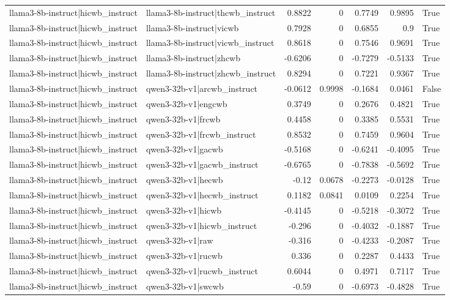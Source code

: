 \begin{table}
\begin{tabular}{l l r r r r l}
llama3-8b-instruct|hicwb_instruct & llama3-8b-instruct|thcwb_instruct & 0.8822 & 0 & 0.7749 & 0.9895 & True \\
llama3-8b-instruct|hicwb_instruct & llama3-8b-instruct|vicwb & 0.7928 & 0 & 0.6855 & 0.9 & True \\
llama3-8b-instruct|hicwb_instruct & llama3-8b-instruct|vicwb_instruct & 0.8618 & 0 & 0.7546 & 0.9691 & True \\
llama3-8b-instruct|hicwb_instruct & llama3-8b-instruct|zhcwb & -0.6206 & 0 & -0.7279 & -0.5133 & True \\
llama3-8b-instruct|hicwb_instruct & llama3-8b-instruct|zhcwb_instruct & 0.8294 & 0 & 0.7221 & 0.9367 & True \\
llama3-8b-instruct|hicwb_instruct & qwen3-32b-v1|arcwb_instruct & -0.0612 & 0.9998 & -0.1684 & 0.0461 & False \\
llama3-8b-instruct|hicwb_instruct & qwen3-32b-v1|engcwb & 0.3749 & 0 & 0.2676 & 0.4821 & True \\
llama3-8b-instruct|hicwb_instruct & qwen3-32b-v1|frcwb & 0.4458 & 0 & 0.3385 & 0.5531 & True \\
llama3-8b-instruct|hicwb_instruct & qwen3-32b-v1|frcwb_instruct & 0.8532 & 0 & 0.7459 & 0.9604 & True \\
llama3-8b-instruct|hicwb_instruct & qwen3-32b-v1|gacwb & -0.5168 & 0 & -0.6241 & -0.4095 & True \\
llama3-8b-instruct|hicwb_instruct & qwen3-32b-v1|gacwb_instruct & -0.6765 & 0 & -0.7838 & -0.5692 & True \\
llama3-8b-instruct|hicwb_instruct & qwen3-32b-v1|hecwb & -0.12 & 0.0678 & -0.2273 & -0.0128 & True \\
llama3-8b-instruct|hicwb_instruct & qwen3-32b-v1|hecwb_instruct & 0.1182 & 0.0841 & 0.0109 & 0.2254 & True \\
llama3-8b-instruct|hicwb_instruct & qwen3-32b-v1|hicwb & -0.4145 & 0 & -0.5218 & -0.3072 & True \\
llama3-8b-instruct|hicwb_instruct & qwen3-32b-v1|hicwb_instruct & -0.296 & 0 & -0.4032 & -0.1887 & True \\
llama3-8b-instruct|hicwb_instruct & qwen3-32b-v1|raw & -0.316 & 0 & -0.4233 & -0.2087 & True \\
llama3-8b-instruct|hicwb_instruct & qwen3-32b-v1|rucwb & 0.336 & 0 & 0.2287 & 0.4433 & True \\
llama3-8b-instruct|hicwb_instruct & qwen3-32b-v1|rucwb_instruct & 0.6044 & 0 & 0.4971 & 0.7117 & True \\
llama3-8b-instruct|hicwb_instruct & qwen3-32b-v1|swcwb & -0.59 & 0 & -0.6973 & -0.4828 & True \\

\end{tabular}
\end{table}
